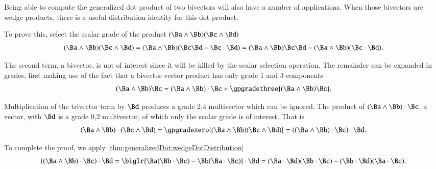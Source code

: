 %
%
Being able to compute the generalized dot product of two bivectors will also have a number of applications.
When those bivectors are wedge products, there is a useful distribution identity for this dot product.


To prove this, select the scalar grade of the product \( (\Ba \wedge \Bb) (\Bc \wedge \Bd) \)
\begin{dmath}\label{eqn:generalizedDot_bivectorDot:1160}
(\Ba \wedge \Bb) (\Bc \wedge \Bd)
=
(\Ba \wedge \Bb) (\Bc \Bd - \Bc \cdot \Bd)
=
(\Ba \wedge \Bb) \Bc \Bd -
(\Ba \wedge \Bb) (\Bc \cdot \Bd).
\end{dmath}

The second term, a bivector, is not of interest since it will be killed by the scalar selection operation.
The remainder can be expanded in grades, first making use of the fact that a bivector-vector product has only
grade 1 and 3 components
\begin{dmath}\label{eqn:generalizedDot_bivectorDot:1180}
(\Ba \wedge \Bb) \Bc
=
(\Ba \wedge \Bb) \cdot \Bc
+ \gpgradethree{ (\Ba \wedge \Bb) \Bc }.
\end{dmath}

Multiplication of the trivector term by \( \Bd \) produces a grade 2,4 multivector which can be ignored.
The product
of \( (\Ba \wedge \Bb) \cdot \Bc \), a vector, with \( \Bd \) is a grade 0,2 multivector, of which only the scalar grade is of interest.
That is
\begin{dmath}\label{eqn:generalizedDot_bivectorDot:1220}
(\Ba \wedge \Bb) \cdot (\Bc \wedge \Bd)
= \gpgradezero{ (\Ba \wedge \Bb) (\Bc \wedge \Bd) }
=
((\Ba \wedge \Bb) \cdot \Bc )\cdot \Bd.
\end{dmath}

To complete the proof, we apply \cref{thm:generalizedDot:wedgeDotDistribution}
\begin{dmath}\label{eqn:generalizedDot_bivectorDot:1240}
((\Ba \wedge \Bb) \cdot \Bc )\cdot \Bd
=
\biglr{ \Ba (\Bb \cdot \Bc) - \Bb (\Ba \cdot \Bc) } \cdot \Bd
=
(\Ba \cdot \Bd) (\Bb \cdot \Bc) - (\Bb \cdot \Bd) (\Ba \cdot \Bc).
\end{dmath}

